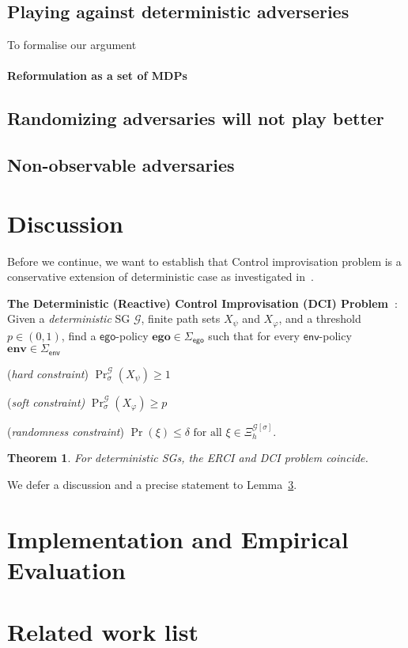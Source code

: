 \documentclass[conference]{IEEEtran}
\newtheorem{theorem}{Theorem}
\theoremstyle{remark}
\newcommand{\sg}{\mathcal{G}}
\renewcommand{\path}{\xi}
\newcommand{\sched}{\sigma}
\newcommand{\scthreshold}{p}
\newcommand{\pOneSched}{\mathbf{ego}}
\newcommand{\POneScheds}{\Sigma_\pOne}
\newcommand{\PTwoScheds}{\Sigma_\pTwo}
\newcommand{\pTwoSched}{\mathbf{env}}
\newcommand{\pOne}{\mathsf{ego}}
\newcommand{\pTwo}{\mathsf{env}}
\newcommand{\pathslbl}{\Xi}
\newcommand{\Paths}[2][]{\pathslbl^{#2}_{#1}}
\begin{document}
\subsection{Playing against deterministic adverseries}
To formalise our argument
\paragraph{Reformulation as a set of MDPs}

\paragraph{}


\subsection{Randomizing adversaries will not play better}

\subsection{Non-observable adversaries}

\section{Discussion}
Before we continue, we want to establish that Control improvisation problem is a conservative extension of deterministic case as investigated in~\cite{}.
\begin{mdframed}
\textbf{The Deterministic (Reactive) Control Improvisation (DCI) Problem~\cite{}}:
Given a \emph{deterministic} SG $\sg$, finite path sets $X_\psi$ and $X_\varphi$, and a threshold $p \in (0,1)$,  find a $\pOne$-policy $\pOneSched \in \POneScheds$  such that for every $\pTwo$-policy $\pTwoSched \in \PTwoScheds$ 
\begin{compactenum}
\item (\emph{hard constraint}) $\Pr^\sg_{\sched}(X_\psi) \geq 1$
	\item (\emph{soft constraint)} $\Pr^\sg_{\sched}(X_\varphi) \geq \scthreshold$
	\item (\emph{randomness constraint}) $\Pr(\path) \leq \delta \text{ for all } \path \in \Paths[h]{\sg[\sched]}$.
\end{compactenum}
\end{mdframed}

\begin{theorem}
	For deterministic SGs, the ERCI and DCI problem coincide.
\end{theorem}
We defer a discussion and a precise statement to Lemma~\ref{}.

\section{Implementation and Empirical Evaluation}

\section{Related work list}
\cite{DBLP:journals/corr/abs-2009-10883}
\cite{}





\end{document}
